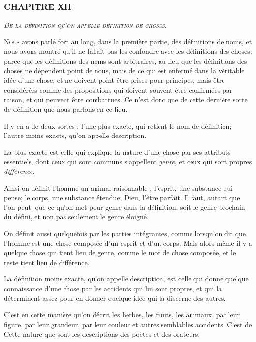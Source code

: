 \subsubsection{\centering \Large CHAPITRE XII}
\begin{center}\emph{\large\scshape De la définition qu'on appelle définition de choses.}\end{center}

	\lettrine{N}{ous} avons parlé fort au long, dans la première partie, des définitions de noms, et nous avons montré qu'il ne fallait pas les confondre avec les définitions des choses; parce que les définitions des noms sont arbitraires, au lieu que les définitions des choses ne dépendent point de nous, mais de ce qui est enfermé dans la véritable idée d'une chose, et ne doivent point être prises pour principes, mais être considérées comme des propositions qui doivent souvent être confirmées par raison, et qui peuvent être combattues. Ce n'est donc que de cette dernière sorte de définition que nous parlons en ce lieu.

Il y en a de deux sortes : l'une plus exacte, qui retient le nom de définition; l'autre moins exacte, qu'on appelle description.

La plus exacte est celle qui explique la nature d'une chose par ses attributs essentiels, dont ceux qui sont communs s'appellent \emph{genre}, et ceux qui sont propres \emph{différence}.

Ainsi on définit l'homme un animal raisonnable ; l'esprit, une substance qui pense; le corps, une substance étendue; Dieu, l'être parfait. Il faut, autant que l'on peut, que ce qu'on met pour genre dans la définition, soit le genre prochain du défini, et non pas seulement le genre éloigné.

On définit aussi quelquefois par les parties intégrantes, comme lorsqu'on dit que l'homme est une chose composée d'un esprit et d'un corps. Mais alors même il y a quelque chose qui tient lieu de genre, comme le mot de chose composée, et le reste tient lieu de différence.

La définition moins exacte, qu'on appelle description, est celle qui donne quelque connaissance d'une chose par les accidents qui lui sont propres, et qui la déterminent assez pour en donner quelque idée qui la discerne des autres.

C'est en cette manière qu'on décrit les herbes, les fruits, les animaux, par leur figure, par leur grandeur, par leur couleur et autres semblables accidents. C'est de Cette nature que sont les descriptions des poètes et des orateurs.

